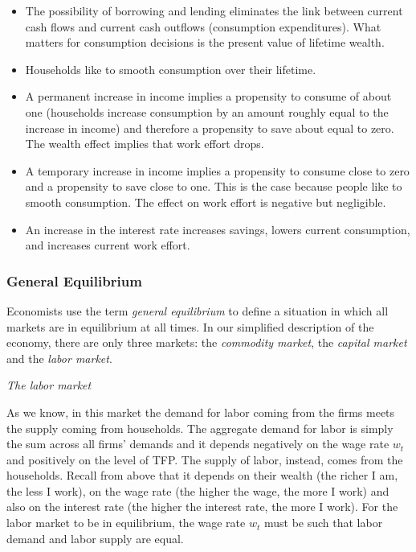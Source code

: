 \documentclass[letterpaper,12pt]{article}
\begin{document}
\begin{itemize}

\item The possibility of borrowing and lending eliminates the link between current cash flows and
current cash outflows (consumption expenditures). What matters for consumption decisions is the
present value of lifetime wealth.

\item Households like to smooth consumption over their lifetime.

\item A permanent increase in income implies a propensity to consume of about one (households
increase consumption by an amount roughly equal to the increase in income) and therefore a
propensity to save about equal to zero. The wealth effect implies that work effort drops.

\item A temporary increase in income implies a propensity to consume close to zero and a
propensity to save close to one. This is the case because people like to smooth consumption. The
effect on work effort is negative but negligible.

\item An increase in the interest rate increases savings, lowers current consumption, and
increases current work effort.

\end{itemize}

\subsubsection*{General Equilibrium}

Economists use the term \textit{general equilibrium} to define a
situation in which all markets are in equilibrium at all times. In
our simplified description of the economy, there are only three
markets: the \textit{commodity market}, the \textit{capital
market} and the \textit{labor market}.

\textit{The labor market}

As we know, in this market the demand for labor coming from the
firms meets the supply coming from households. The aggregate
demand for labor is simply the sum across all firms' demands and
it depends negatively on the wage rate $w_{t}$ and positively on
the level of TFP. The supply of labor, instead, comes from the
households. Recall from above that it depends on their wealth (the
richer I am, the less I work), on the wage rate (the higher the
wage, the more I work) and also on the interest rate (the higher
the interest rate, the more I work). For the labor market to be in
equilibrium, the wage rate $w_{t}$ must be such that labor demand
and labor supply are equal.
\end{document}
